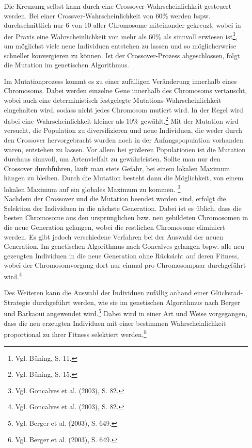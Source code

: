 \documentclass[a4paper,12pt,parskip,bibtotoc,liststotoc]{article}
\begin{document}
Die Kreuzung selbst kann durch eine Crossover-Wahrscheinlichkeit gesteuert werden. 
Bei einer Crossver-Wahrscheinlichkeit von 60\% werden bspw. durchschnittlich nur 6 von 10 aller Chromosome miteinander gekreuzt, wobei in der Praxis eine Wahrscheinlichkeit von mehr als 60\% als sinnvoll erwiesen ist\footnote{Vgl. Büning, S. 11.}, um möglichst viele neue Individuen entstehen zu lassen und so möglicherweise schneller konvergieren zu können.
Ist der Crossover-Prozess abgeschlossen, folgt die Mutation im genetischen Algorithmus.

Im Mutationprozess kommt es zu einer zufälligen Veränderung innerhalb eines Chromosoms. 
Dabei werden einzelne Gene innerhalb des Chromosoms vertauscht, wobei auch eine deterministisch festgelegte Mutations-Wahrscheinlichkeit eingehalten wird, sodass nicht jedes Chromosom mutiert wird. 
In der Regel wird dabei eine Wahrscheinlichkeit kleiner als 10\% gewählt.\footnote{Vgl. Büning, S. 15.}
Mit der Mutation wird versucht, die Population zu diversifizieren und neue Individuen, die weder durch den Crossover hervorgebracht wurden noch in der Anfangspopulation vorhanden waren, entstehen zu lassen. Vor allem bei größeren Populationen ist die Mutation durchaus sinnvoll, um Artenvielfalt zu gewährleisten. Sollte man nur den Crossover durchführen, läuft man stets Gefahr, bei einem lokalen Maximum hängen zu bleiben. Durch die Mutation besteht dann die Möglichkeit, von einem lokalen Maximum auf ein globales Maximum zu kommen. \footnote{Vgl. Goncalves et al. (2003), S. 82.}\\

Nachdem der Crossover und die Mutation beendet worden sind, erfolgt die Selektion der Individuen in die nächste Generation. 
Dabei ist es üblich, dass die besten Chromosome aus den ursprünglichen bzw. neu gebildeten Chromosomen in die neue Generation gelangen, wobei die restlichen Chromosome eliminiert werden. 
Es gibt jedoch verschiedene Verfahren bei der Auswahl der neuen Generation.
Im genetischen Algorithmus nach Goncalves gelangen bspw. alle neu gezeugten Individuen in die neue Generation ohne Rücksicht auf deren Fitness, wobei der Chromosomvorgang dort nur einmal pro Chromosompaar durchgeführt wird.\footnote{Vgl. Goncalves et al. (2003), S. 82.}

Des Weiteren kann die Auswahl der Individuen zufällig anhand einer Glücksrad-Strategie durchgeführt werden, wie sie im genetischen Algorithmus nach Berger und Barkaoui angewendet wird.\footnote{Vgl. Berger et al. (2003), S. 649.}
Dabei wird in einer Art und Weise vorgegangen, dass die neu erzeugten Individuen mit einer bestimmen Wahrscheinlichkeit proportional zu ihrer Fitness selektiert werden.\footnote{Vgl. Berger et al. (2003), S. 649.}
\end{document}
